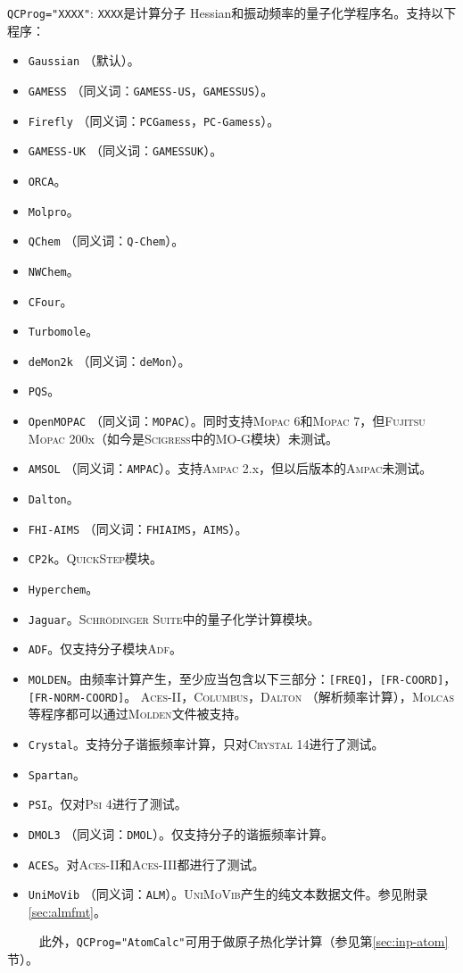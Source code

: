 \documentclass[12pt,a4paper,openany,twoside,cap]{ctexbook}
\begin{document}
\bigskip{}
\verb|QCProg="XXXX"|: \verb|XXXX|是计算分子 Hessian和振动频率的量子化学程序名。支持以下程序：
\begin{itemize}
\item \verb|Gaussian| （默认）。
\item \verb|GAMESS| （同义词：\verb|GAMESS-US|，\verb|GAMESSUS|）。
\item \verb|Firefly| （同义词：\verb|PCGamess|，\verb|PC-Gamess|）。
\item \verb|GAMESS-UK| （同义词：\verb|GAMESSUK|）。
\item \verb|ORCA|。
\item \verb|Molpro|。
\item \verb|QChem| （同义词：\verb|Q-Chem|）。
\item \verb|NWChem|。
\item \verb|CFour|。
\item \verb|Turbomole|。
\item \verb|deMon2k| （同义词：\verb|deMon|）。
\item \verb|PQS|。
\item \verb|OpenMOPAC| （同义词：\verb|MOPAC|）。同时支持\textsc{Mopac} 6和\textsc{Mopac} 7，但\textsc{Fujitsu Mopac} 200x（如今是\textsc{Scigress}中的MO-G模块）未测试。
\item \verb|AMSOL| （同义词：\verb|AMPAC|）。支持\textsc{Ampac} 2.x，但以后版本的\textsc{Ampac}未测试。
\item \verb|Dalton|。
\item \verb|FHI-AIMS| （同义词：\verb|FHIAIMS|，\verb|AIMS|）。
\item \verb|CP2k|。\textsc{QuickStep}模块。
\item \verb|Hyperchem|。
\item \verb|Jaguar|。\textsc{Schr\"odinger Suite}中的量子化学计算模块。
\item \verb|ADF|。仅支持分子模块\textsc{Adf}。
\item \verb|MOLDEN|。由频率计算产生，至少应当包含以下三部分：\verb|[FREQ]|，\verb|[FR-COORD]|，\verb|[FR-NORM-COORD]|。 \textsc{Aces-II}，\textsc{Columbus}，\textsc{Dalton} （解析频率计算），\textsc{Molcas}等程序都可以通过\textsc{Molden}文件被支持。
\item \verb|Crystal|。支持分子谐振频率计算，只对\textsc{Crystal} 14进行了测试。
\item \verb|Spartan|。
\item \verb|PSI|。仅对\textsc{Psi} 4进行了测试。
\item \verb|DMOL3| （同义词：\verb|DMOL|）。仅支持分子的谐振频率计算。
\item \verb|ACES|。对\textsc{Aces-II}和\textsc{Aces-III}都进行了测试。
\item \verb|UniMoVib| （同义词：\verb|ALM|）。\textsc{UniMoVib}产生的纯文本数据文件。参见附录\ref{sec:almfmt}。
\end{itemize}
\verb|     |此外，\verb|QCProg="AtomCalc"|可用于做原子热化学计算（参见第\ref{sec:inp-atom}节）。
\end{document}
